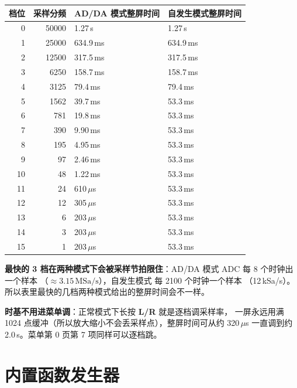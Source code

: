 \documentclass[UTF8,a4paper,11pt]{ctexart}
\begin{document}
\begin{center}
\small
\begin{tabular}{rrll}
\toprule
档位 & 采样分频 & AD/DA 模式整屏时间 & 自发生模式整屏时间\\
\midrule
 0 & 50000 & 1.27\,s      & 1.27\,s\\
 1 & 25000 & 634.9\,ms    & 634.9\,ms\\
 2 & 12500 & 317.5\,ms    & 317.5\,ms\\
 3 &  6250 & 158.7\,ms    & 158.7\,ms\\
 4 &  3125 & 79.4\,ms     & 79.4\,ms\\
 5 &  1562 & 39.7\,ms     & 53.3\,ms\\
 6 &   781 & 19.8\,ms     & 53.3\,ms\\
 7 &   390 & 9.90\,ms     & 53.3\,ms\\
 8 &   195 & 4.95\,ms     & 53.3\,ms\\
 9 &    97 & 2.46\,ms     & 53.3\,ms\\
10 &    48 & 1.22\,ms     & 53.3\,ms\\
11 &    24 & 610\,$\mu$s  & 53.3\,ms\\
12 &    12 & 305\,$\mu$s  & 53.3\,ms\\
13 &     6 & 203\,$\mu$s  & 53.3\,ms\\
14 &     3 & 203\,$\mu$s  & 53.3\,ms\\
15 &     1 & 203\,$\mu$s  & 53.3\,ms\\
\bottomrule
\end{tabular}
\end{center}

\begin{tipbox}
\textbf{最快的 3 档在两种模式下会被采样节拍限住}：AD/DA 模式 ADC 每 8 个时钟出一个样本
（$\approx3.15\,\mathrm{MSa/s}$），自发生模式  每 2100 个时钟一个样本
（12\,kSa/s）。所以表里最快的几档两种模式给出的整屏时间会不一样。
\end{tipbox}

\begin{tipbox}
\textbf{时基不用进菜单调}：正常模式下长按 \textbf{L/R} 就是逐档调采样率，
一屏永远用满 1024 点缓冲（所以放大缩小不会丢采样点），整屏时间可从约 320\,$\mu$s
一直调到约 2.0\,s。菜单第 0 页第 7 项同样可以逐档跳。
\end{tipbox}

\section{内置函数发生器}
\end{document}

